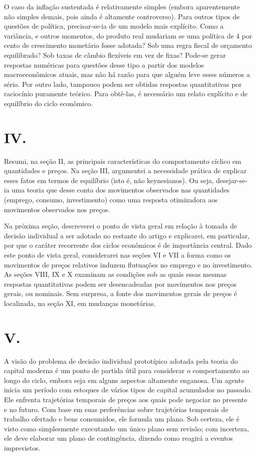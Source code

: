 \documentclass[12pt]{article}
\begin{document}
O caso da inflação sustentada é relativamente simples (embora aparentemente não simples demais, pois ainda é altamente controverso). Para outros tipos de questões de política, precisar-se-ia de um modelo mais explícito. Como a variância, e outros momentos, do produto real mudariam se uma política de 4 por cento de crescimento monetário fosse adotada? Sob uma regra fiscal de orçamento equilibrado? Sob taxas de câmbio flexíveis em vez de fixas? Pode-se gerar respostas numéricas para questões desse tipo a partir dos modelos macroeconômicos atuais, mas não há razão para que alguém leve esses números a sério. Por outro lado, tampouco podem ser obtidas respostas quantitativas por raciocínio puramente teórico. Para obtê-las, é necessário um relato explícito e de equilíbrio do ciclo econômico.

\section*{IV.}

Resumi, na seção II, as principais características do comportamento cíclico em quantidades e preços. Na seção III, argumentei a necessidade prática de explicar esses fatos em termos de equilíbrio (isto é, não keynesianos). Ou seja, desejar-se-ia uma teoria que desse conta dos movimentos observados nas quantidades (emprego, consumo, investimento) como uma resposta otimizadora aos movimentos observados nos preços.

Na próxima seção, descreverei o ponto de vista geral em relação à tomada de decisão individual a ser adotado no restante do artigo e explicarei, em particular, por que o caráter recorrente dos ciclos econômicos é de importância central. Dado este ponto de vista geral, considerarei nas seções VI e VII a forma como os movimentos de preços relativos induzem flutuações no emprego e no investimento. As seções VIII, IX e X examinam as condições sob as quais essas mesmas respostas quantitativas podem ser desencadeadas por movimentos nos preços gerais, ou nominais. Sem surpresa, a fonte dos movimentos gerais de preços é localizada, na seção XI, em mudanças monetárias.

\section*{V.}

A visão do problema de decisão individual prototípico adotada pela teoria do capital moderna é um ponto de partida útil para considerar o comportamento ao longo do ciclo, embora seja em alguns aspectos altamente enganosa. Um agente inicia um período com estoques de vários tipos de capital acumulados no passado. Ele enfrenta trajetórias temporais de preços aos quais pode negociar no presente e no futuro. Com base em suas preferências sobre trajetórias temporais de trabalho ofertado e bens consumidos, ele formula um plano. Sob certeza, ele é visto como simplesmente executando um único plano sem revisão; com incerteza, ele deve elaborar um plano de contingência, dizendo como reagirá a eventos imprevistos.
\end{document}
